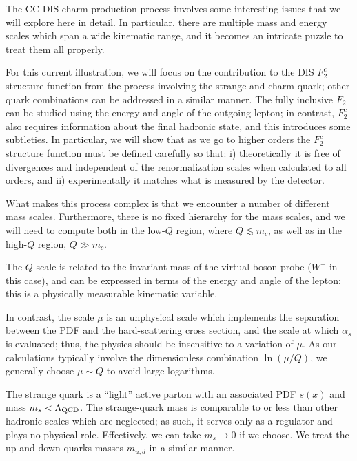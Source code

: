 %
The CC DIS charm production process involves some interesting issues
that we will explore here in detail. In particular, there are multiple
mass and energy scales which span a wide kinematic range, and it
becomes an intricate puzzle to treat them all properly.

For this current illustration, we will focus on the contribution to
the DIS $F_{2}^{c}$ structure function from the process involving the
strange and charm quark; other quark combinations can be addressed in
a similar manner.
%
The fully inclusive $F_2$ can be studied using the energy and angle of
the outgoing lepton; in contrast, $F_{2}^{c}$ also requires
information about the final hadronic state, and this introduces some
subtleties.
%
In particular, we will show that as we go to higher orders the
$F_{2}^{c}$ structure function must be defined carefully so that: i)
theoretically it is free of divergences and independent of the
renormalization scales when calculated to all orders, 
and ii) experimentally it matches what is
measured by the detector.

%
What makes this process complex is that we encounter a number of
different mass scales. Furthermore, there is no fixed hierarchy for
the mass scales, and we will need to compute both in the low-$Q$
region, where $Q\lesssim m_{c}$, as well as in the high-$Q$ region,
$Q\gg m_{c}$.

The $Q$ scale is related to the invariant mass of the virtual-boson probe
($W^{+}$ in this case), and can be expressed in terms of the energy and angle of
the lepton; this is a physically measurable kinematic variable.

In contrast, the scale $\mu$ is an unphysical scale which implements
the separation between the PDF and the hard-scattering cross section, 
and the scale at which $\alpha_{s}$ is evaluated;
thus, the physics should be insensitive to a variation of $\mu$. As
our calculations typically involve the dimensionless combination
$\ln(\mu/Q)$, we generally choose $\mu\sim Q$ to avoid large
logarithms.

The strange quark is a ``light'' active parton with an associated PDF
$s(x)$ and mass $m_{s} < \Lambda_{\rm QCD}$. The strange-quark mass is
comparable to or less than other hadronic scales which are neglected;
as such, it serves only as a regulator and plays no physical
role. Effectively, we can take $m_{s}\to 0$ if we choose.
%
We treat the up and down quarks masses $m_{u,d}$ in a similar manner.

